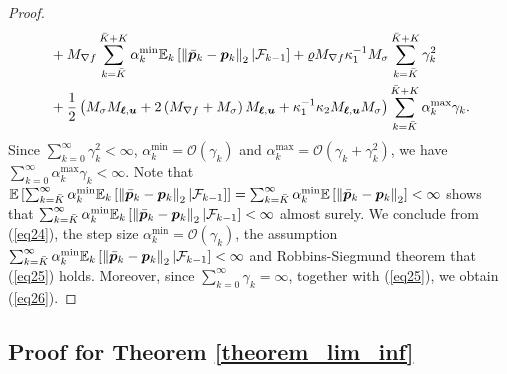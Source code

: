 \documentclass[aos]{imsart}
\numberwithin{equation}{section}
\theoremstyle{plain}
\begin{document}
\begin{appendix}
\begin{proof}
\begin{equation}
\begin{split}
            &  + M_{\nabla f} \sum_{k=\Bar{K}}^{\Bar{K} + K} \alpha_k^{\text{min}} \mathbb{E}_k \left[ \left\|\Bar{\bm{p}}_k - \bm{p}_k \right\|_2 | \mathcal{F}_{k-1} \right] + \varrho M_{\nabla f} \kappa_1^{-1} M_{\sigma} \sum_{k=\Bar{K}}^{\Bar{K} + K} \gamma_k^2 \\
            &  + \frac{1}{2} \left( M_{\sigma} M_{\bm{\ell},\bm{u}} + 2 \left(M_{\nabla f} + M_{\sigma} \right)  M_{\bm{\ell},\bm{u}} + \kappa_1^{-1} \kappa_2 M_{\bm{\ell},\bm{u}} M_{\sigma} \right) \sum_{k=\Bar{K}}^{\Bar{K} + K}  \alpha_k^{\text{max}} \gamma_k.
      \end{split}
    \end{equation} 
    Since $\sum_{k=0}^{\infty} \gamma_k^2 < \infty$, $\alpha_k^{\text{min}} = \mathcal{O}\left( \gamma_k \right)$ and  $\alpha_k^{\text{max}} = \mathcal{O}\left( \gamma_k + \gamma_k^2 \right)$, we have $\sum_{k=0}^{\infty} \alpha_k^{\text{max}} \gamma_k < \infty$. Note that $\mathbb{E} \left[\sum_{k=\Bar{K}}^{\infty} \alpha_k^{\text{min}} \mathbb{E}_k \left[\left\|\Bar{\bm{p}}_k - \bm{p}_k \right\|_2| \mathcal{F}_{k-1} \right]\right] = \sum_{k=\Bar{K}}^{\infty} \alpha_k^{\text{min}} \mathbb{E} \left[\left\|\Bar{\bm{p}}_k - \bm{p}_k \right\|_2\right] < \infty$ shows that $\sum_{k=\Bar{K}}^{\infty} \alpha_k^{\text{min}} \mathbb{E}_k \left[\left\|\Bar{\bm{p}}_k - \bm{p}_k \right\|_2| \mathcal{F}_{k-1} \right] < \infty$ almost surely. We conclude from (\ref{eq24}), the step size $\alpha_k^{\text{min}} = \mathcal{O}\left( \gamma_k \right)$, the assumption $\sum_{k=\Bar{K}}^{\infty} \alpha_k^{\text{min}} \mathbb{E}_k \left[\left\|\Bar{\bm{p}}_k - \bm{p}_k \right\|_2| \mathcal{F}_{k-1} \right] < \infty$ and Robbins-Siegmund theorem \cite{robbins1971convergence} that (\ref{eq25}) holds. Moreover, since $\sum_{k=0}^{\infty} \gamma_k = \infty$, together with (\ref{eq25}), we obtain (\ref{eq26}).
\end{proof}


\subsection{Proof for Theorem \ref{theorem_lim_inf}}


\end{appendix}
\end{document}
